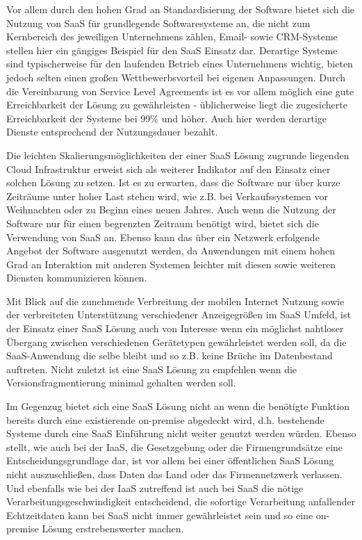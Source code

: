 Vor allem durch den hohen Grad an Standardisierung der Software bietet sich die Nutzung von SaaS für grundlegende Softwaresysteme an, die nicht zum Kernbereich des jeweiligen Unternehmens zählen, Email- sowie CRM-Systeme stellen hier ein gängiges Beispiel für den SaaS Einsatz dar. Derartige Systeme sind typischerweise für den laufenden Betrieb eines Unternehmens wichtig, bieten jedoch selten einen großen Wettbewerbsvorteil bei eigenen Anpassungen. Durch die Vereinbarung von Service Level Agreements ist es vor allem möglich eine gute Erreichbarkeit der Lösung zu gewährleisten - üblicherweise liegt die zugesicherte Erreichbarkeit der Systeme bei 99\% und höher. Auch hier werden derartige Dienste entsprechend der Nutzungsdauer bezahlt.

Die leichten Skalierungsmöglichkeiten der einer SaaS Lösung zugrunde liegenden Cloud Infrastruktur erweist sich als weiterer Indikator auf den Einsatz einer solchen Lösung zu setzen. Ist es zu erwarten, dass die Software nur über kurze Zeiträume unter hoher Last stehen wird, wie z.B. bei Verkaufssystemen vor Weihnachten oder zu Beginn eines neuen Jahres. Auch wenn die Nutzung der Software nur für einen begrenzten Zeitraum benötigt wird, bietet sich die Verwendung von SaaS an. Ebenso kann das über ein Netzwerk erfolgende Angebot der Software ausgenutzt werden, da Anwendungen mit einem hohen Grad an Interaktion mit anderen Systemen leichter mit diesen sowie weiteren Diensten kommunizieren können. 

Mit Blick auf die zunehmende Verbreitung der mobilen Internet Nutzung sowie der verbreiteten Unterstützung verschiedener Anzeigegrößen im SaaS Umfeld, ist der Einsatz einer SaaS Lösung auch von Interesse wenn ein möglichst nahtloser Übergang zwischen verschiedenen Gerätetypen gewährleistet werden soll, da die SaaS-Anwendung die selbe bleibt und so z.B. keine Brüche im Datenbestand auftreten. Nicht zuletzt ist eine SaaS Lösung zu empfehlen wenn die Versionsfragmentierung minimal gehalten werden soll.

Im Gegenzug bietet sich eine SaaS Lösung nicht an wenn die benötigte Funktion bereits durch eine existierende on-premise abgedeckt wird, d.h. bestehende Systeme durch eine SaaS Einführung nicht weiter genutzt werden würden. Ebenso stellt, wie auch bei der IaaS, die Gesetzgebung oder die Firmengrundsätze eine Entscheidungsgrundlage dar, ist vor allem bei einer öffentlichen SaaS Lösung nicht auszuschließen, dass Daten das Land oder das Firmennetzwerk verlassen. Und ebenfalls wie bei der IaaS zutreffend ist auch bei SaaS die nötige Verarbeitungsgeschwindigkeit entscheidend, die sofortige Verarbeitung anfallender Echtzeitdaten kann bei SaaS nicht immer gewährleistet sein und so eine on-premise Lösung erstrebenswerter machen. \cite{technet} \cite{rackSpace} \cite{ibm2011}

